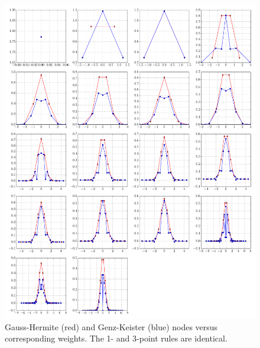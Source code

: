 \documentclass[a4paper,10pt]{article}
\begin{document}
\begin{figure}[h]
  \centering
  \includegraphics[width=\linewidth]{./img/gk_hermitephy_nodes_1d.pdf}
  \caption{Gauss-Hermite (red) and Genz-Keister (blue) nodes versus
  corresponding weights. The 1- and 3-point rules are identical.}
  \label{fig:gk_hermitephy_nodes_1d}
\end{figure}
\end{document}
